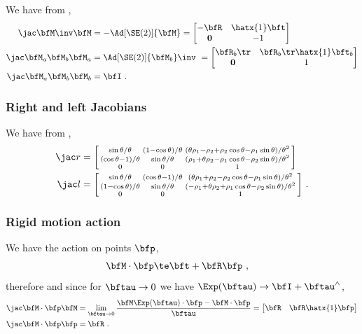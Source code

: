 We have from ,
%
\begin{align}
\mjac{\bfM\inv}{\bfM} &= -\Ad[\SE(2)]{\bfM} = \begin{bmatrix} -\bfR & \hatx{1}\bft \\ \bf0 & -1 \end{bmatrix}  \\
\mjac{\bfM_a\bfM_b}{\bfM_a} &= \Ad[\SE(2)]{\bfM_b}\inv ~= \begin{bmatrix} \bfR_b\tr & \bfR_b\tr\hatx{1}\bft_b \\ \bf0 & 1 \end{bmatrix} \\
\mjac{\bfM_a\bfM_b}{\bfM_b} &= \bfI 
~.
\end{align}

\subsubsection{Right and left Jacobians}

We have from \cite[pag.~36]{CHIRIKJIAN-11},
%
\begin{align}
\mjac{}{r} &= \begin{bsmallmatrix}
\sin\theta/\theta & (1-\cos\theta)/\theta & (\theta \rho_1 - \rho_2 + \rho_2 \cos\theta - \rho_1 \sin\theta)/\theta^2 \\
(\cos\theta-1)/\theta & \sin\theta/\theta & (\rho_1 + \theta \rho_2 - \rho_1 \cos\theta - \rho_2 \sin\theta)/\theta^2 \\
0 & 0 & 1
\end{bsmallmatrix} \\
\mjac{}{l} &= \begin{bsmallmatrix}
\sin\theta/\theta & (\cos\theta-1)/\theta & (\theta \rho_1 + \rho_2 - \rho_2 \cos\theta - \rho_1 \sin\theta)/\theta^2 \\
(1-\cos\theta)/\theta & \sin\theta/\theta & (-\rho_1 + \theta \rho_2 + \rho_1 \cos\theta - \rho_2 \sin\theta)/\theta^2 \\
0 & 0 & 1
\end{bsmallmatrix} 
~.
\end{align}

\subsubsection{Rigid motion action}

We have the action on points $\bfp$,
%
\begin{align}
\bfM\cdot\bfp &\te \bft+\bfR\bfp
~,
\end{align}
%
therefore and since for ${\bftau}\to0$ we have $\Exp(\bftau)\to\bfI+\bftau\hhat$, 
%
\begin{align}
\mjac{\bfM\cdot\bfp}{\bfM} 
  &= 
  \lim_{\bftau\to0}\frac{\bfM\Exp(\bftau)\cdot\bfp - \bfM\cdot\bfp}{\bftau}
  = 
  \begin{bmatrix}\bfR & \bfR\hatx{1}\bfp\end{bmatrix} \\
\mjac{\bfM\cdot\bfp}{\bfp} &= \bfR 
~.
\end{align}
%

